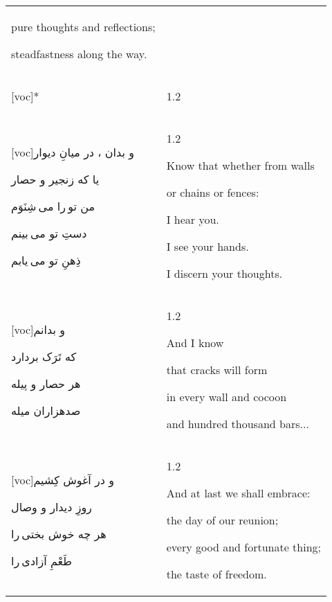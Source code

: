 \documentclass[11pt]{article}
\makeatletter
\newenvironment{orig}
  {\begin{farsi}[voc]}
  {\end{farsi}}
\newenvironment{trans}
  {\Large\begin{spacing}{1.2}\raggedright}
  {\end{spacing}}
\newenvironment{word}
  {\begin{longtable}[t]{p{2.75in}@{\hspace{3em}}p{2.875in}}}
  {\end{longtable}}
\newcommand{\ayat}[2]{\begin{orig}#1\end{orig} & \begin{trans}#2\end{trans}}
\makeatother
\begin{document}
\begin{word}
{pure thoughts and reflections;

steadfastness along the way.
} \vspace{-1ex}\\

\ayat{*}{} \vspace{-1ex}\\

\ayat{و بدان ، در میانِ دیوار

یا که زنجیر و حصار

من تو را می شِنَوَم

دستِ تو می بینم

ذِهنِ تو می یابم}{
\vspace{1em}
Know that whether from walls

or chains or fences:

I hear you.

I see your hands.

I discern your thoughts.
} \vspace{-1ex}\\

\ayat{و بدانم

که تَرَک بردارد

هر حصار و پیله

صدهزاران میله}{
\vspace{1em}
And I know

that cracks will form

in every wall and cocoon

and hundred thousand bars...
} \vspace{-1ex}\\

\ayat{و در آغوش کِشیم

روزِ دیدار و وصال

هر چه خوش بختی را

طَعْمِ آزادی را}{
\vspace{1em}
And at last we shall embrace:

the day of our reunion;

every good and fortunate thing;

the taste of freedom.
}

\end{word}
\end{document}
